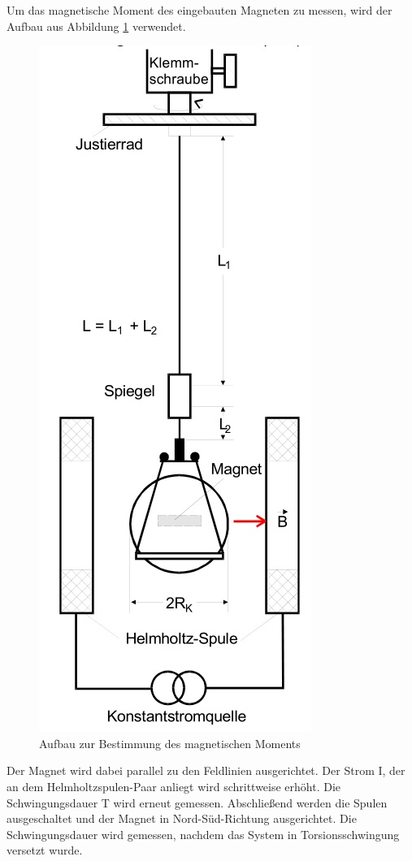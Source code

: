 Um das magnetische Moment des eingebauten Magneten zu messen, wird der Aufbau
aus Abbildung \ref{mess2} verwendet.
\begin{figure}[H]
  \centering
  \includegraphics[height=0.5\textwidth]{bilder/aufbau2.jpg}
  \caption{Aufbau zur Bestimmung des magnetischen Moments \cite{102}}
  \label{mess2}
\end{figure}
Der Magnet wird dabei parallel zu den Feldlinien ausgerichtet. Der Strom I, der
an dem Helmholtzspulen-Paar anliegt wird schrittweise erhöht. Die
Schwingungsdauer T wird erneut gemessen.
Abschließend werden die Spulen ausgeschaltet und der Magnet in Nord-Süd-Richtung
ausgerichtet. Die Schwingungsdauer wird gemessen, nachdem das System in
Torsionsschwingung versetzt wurde.
